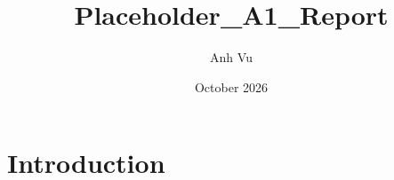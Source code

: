 \documentclass{article}
\title{Placeholder_A1_Report}
\author{Anh Vu}
\date{October 2026}
\begin{document}
\maketitle

\section{Introduction}
\end{document}
